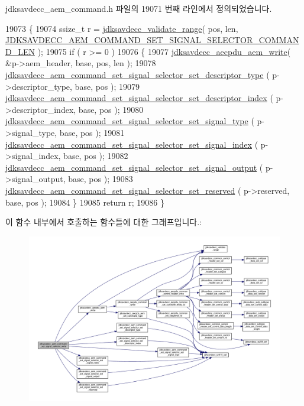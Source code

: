 jdksavdecc\+\_\+aem\+\_\+command.\+h 파일의 19071 번째 라인에서 정의되었습니다.


\begin{DoxyCode}
19073 \{
19074     ssize\_t r = \hyperlink{group__util_ga9c02bdfe76c69163647c3196db7a73a1}{jdksavdecc\_validate\_range}( pos, len, 
      \hyperlink{group__command__set__signal__selector_ga83f59269adfc23a88c27c293398c953d}{JDKSAVDECC\_AEM\_COMMAND\_SET\_SIGNAL\_SELECTOR\_COMMAND\_LEN}
       );
19075     \textcolor{keywordflow}{if} ( r >= 0 )
19076     \{
19077         \hyperlink{group__aecpdu__aem_gad658e55771cce77cecf7aae91e1dcbc5}{jdksavdecc\_aecpdu\_aem\_write}( &p->aem\_header, base, pos, len );
19078         \hyperlink{group__command__set__signal__selector_ga88810c2d439e98cc401b492f9e4badd6}{jdksavdecc\_aem\_command\_set\_signal\_selector\_set\_descriptor\_type}
      ( p->descriptor\_type, base, pos );
19079         \hyperlink{group__command__set__signal__selector_ga90ddd0b7b5e6229265253f07498c30dd}{jdksavdecc\_aem\_command\_set\_signal\_selector\_set\_descriptor\_index}
      ( p->descriptor\_index, base, pos );
19080         \hyperlink{group__command__set__signal__selector_gab5f9576f538aace59f8adea60bac9771}{jdksavdecc\_aem\_command\_set\_signal\_selector\_set\_signal\_type}
      ( p->signal\_type, base, pos );
19081         \hyperlink{group__command__set__signal__selector_ga46271aad016ed06685d033cf29419680}{jdksavdecc\_aem\_command\_set\_signal\_selector\_set\_signal\_index}
      ( p->signal\_index, base, pos );
19082         \hyperlink{group__command__set__signal__selector_ga01401925e00059c2e887c86ee75a0937}{jdksavdecc\_aem\_command\_set\_signal\_selector\_set\_signal\_output}
      ( p->signal\_output, base, pos );
19083         \hyperlink{group__command__set__signal__selector_gadff24d1dd91f8ebcaace3f2d863674e3}{jdksavdecc\_aem\_command\_set\_signal\_selector\_set\_reserved}
      ( p->reserved, base, pos );
19084     \}
19085     \textcolor{keywordflow}{return} r;
19086 \}
\end{DoxyCode}


이 함수 내부에서 호출하는 함수들에 대한 그래프입니다.\+:
\nopagebreak
\begin{figure}[H]
\begin{center}
\leavevmode
\includegraphics[width=350pt]{group__command__set__signal__selector_gafb001fca2c7cdb6d4e698c6678f8fdfc_cgraph}
\end{center}
\end{figure}



